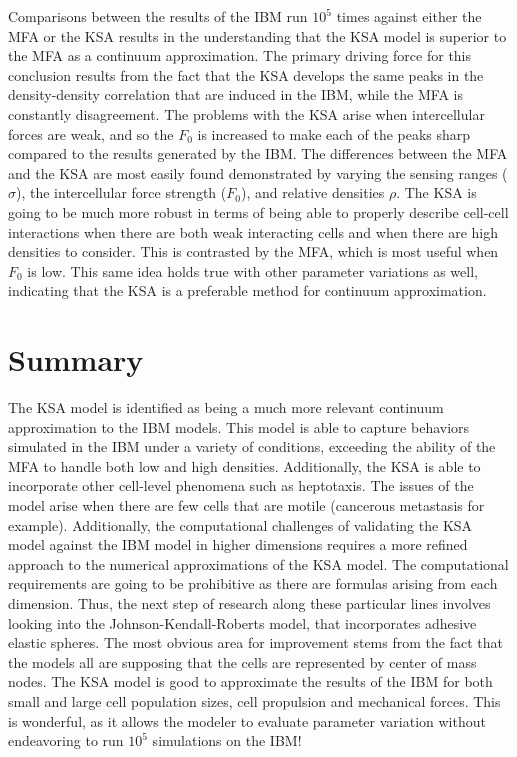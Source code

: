 \documentclass[12pt,letterpaper,cm]{article}
\renewcommand{\.}{\cdot}
\newcommand{\<}{\langle}
\renewcommand{\>}{\rangle}
\begin{document}
	Comparisons between the results of the IBM run $10^5$ times against either the MFA or the KSA results in the understanding that the KSA model is superior to the MFA as a continuum approximation.  The primary driving force for this conclusion results from the fact that the KSA develops the same peaks in the density-density correlation that are induced in the IBM, while the MFA is constantly  disagreement.  The problems with the KSA arise when intercellular forces are weak, and so the $F_0$ is increased to make each of the peaks sharp compared to the results generated by the IBM.  The differences between the MFA and the KSA are most easily found demonstrated by varying the sensing ranges ($\sigma$), the intercellular force strength ($F_0$), and relative densities $\rho$.  The KSA is going to be much more robust in terms of being able to properly describe cell-cell interactions when there are both weak interacting cells and when there are high densities to consider.  This is contrasted by the MFA, which is most useful when $F_0$ is low.  This same idea holds true with other parameter variations as well, indicating that the KSA is a preferable method for continuum approximation.
	\section{Summary}
	\indent
	
	The KSA model is identified as being a much more relevant continuum approximation to the IBM models.  This model is able to capture behaviors simulated in the IBM under a variety of conditions, exceeding the ability of the MFA to handle both low and high densities.  Additionally, the KSA is able to incorporate other cell-level phenomena such as heptotaxis.  The issues of the model arise when there are few cells that are motile (cancerous metastasis for example).  Additionally, the computational challenges of validating the KSA model against the IBM model in higher dimensions requires a more refined approach to the numerical approximations of the KSA model.  The computational requirements are going to be prohibitive as there are formulas arising from each dimension.  Thus, the next step of research along these particular lines involves looking into the Johnson-Kendall-Roberts model, that incorporates adhesive elastic spheres. The most obvious area for improvement stems from the fact that the models all are supposing that the cells are represented by center of mass nodes.  The KSA model is good to approximate the results of the IBM for both small and large cell population sizes, cell propulsion and mechanical forces.  This is wonderful, as it allows the modeler to evaluate parameter variation without endeavoring to run $10^5$ simulations on the IBM!

	
	\printbibliography
	
	
	
\end{document}

